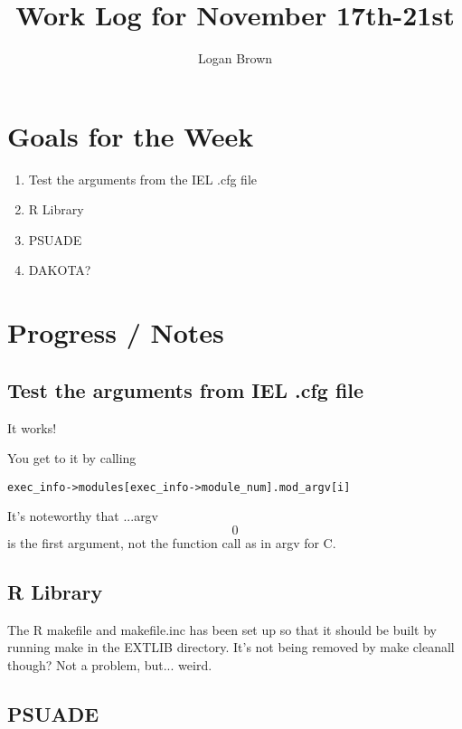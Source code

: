 

\title{Work Log for November 17th-21st}
\author{Logan Brown}


\maketitle


\section{Goals for the Week}
\begin{enumerate}
\item Test the arguments from the IEL .cfg file
\item R Library
\item PSUADE
\item DAKOTA?
\end{enumerate}


\section{Progress / Notes}
\subsection{Test the arguments from IEL .cfg file}

It works!

You get to it by calling
\begin{verbatim}
exec_info->modules[exec_info->module_num].mod_argv[i]
\end{verbatim}

It's noteworthy that ...argv\[0\] is the first argument, not the function call as in argv for C.

\subsection{R Library}
The R makefile and makefile.inc has been set up so that it should be built by running make in the EXTLIB directory.
It's not being removed by make cleanall though? Not a problem, but... weird.

\subsection{PSUADE}

